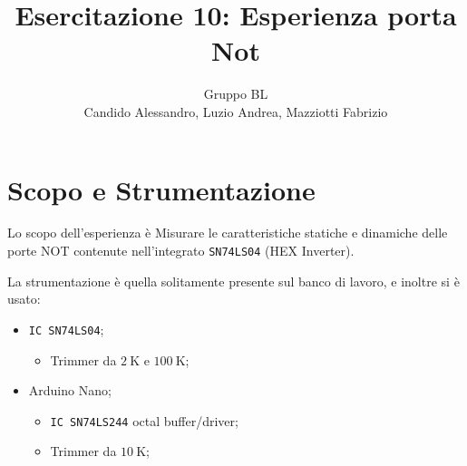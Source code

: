 \documentclass[a4paper,10pt]{article}
\title{Esercitazione 10: Esperienza porta Not} %
\author{Gruppo BL \\ Candido Alessandro, Luzio Andrea, Mazziotti Fabrizio}
\def\code#1{\texttt{#1}}
\begin{document}
\maketitle




\section{Scopo e Strumentazione}
Lo scopo dell'esperienza è Misurare le caratteristiche statiche e dinamiche delle porte NOT contenute nell’integrato \code{SN74LS04} (HEX Inverter).

La strumentazione è quella solitamente presente sul banco di lavoro, e inoltre si è usato:
\begin{itemize}
	\item \code{IC SN74LS04};
	\begin{itemize}
		\item Trimmer da $2~$K e $100~$K;
	\end{itemize}
	\item Arduino Nano; 
	\begin{itemize}
		\item \code{IC SN74LS244} octal buffer/driver; 
		\item Trimmer da $10~$K;
	\end{itemize}
\end{itemize}

%
%
%
\end{document}

